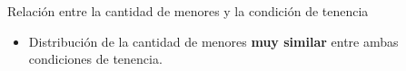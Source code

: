 \documentclass[aspectratio=169]{beamer}
\begin{document}
    \begin{frame}{Relación entre la cantidad de menores y la condición de tenencia}
        \begin{minipage}{.65\linewidth}
            \begin{overlayarea}{\linewidth}{.75\textheight}
            \end{overlayarea}
        \end{minipage}
        \begin{minipage}{.34\linewidth}
            \setlength{\leftmargini}{8pt}
            \small
            \begin{itemize}
                \item<2-> Distribución de la cantidad de menores \textbf{muy similar} entre ambas condiciones de tenencia.


\end{itemize}
\end{minipage}
\end{frame}
\end{document}
